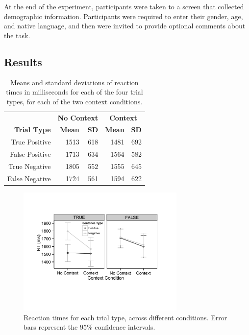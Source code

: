 \documentclass[10pt,letterpaper]{article}
\begin{document}
At the end of the experiment, participants were taken to a screen that collected demographic information.  Participants were required to enter their gender, age, and native language, and then were invited to provide optional comments about the task.  

\subsection{Results}

\begin{table}[t]
\caption{Means and standard deviations of reaction times in milliseconds for each of the four trial types, for each of the two context conditions.}
\begin{center}
\small\addtolength{\tabcolsep}{-5pt}
\begin{tabular}{ r  r  r  r  r } 
\hline
& \multicolumn{2}{c}{\bf{No Context}} & \multicolumn{2}{c}{\bf{Context}} \\
  \bf{Trial Type} & \bf{Mean} & \bf{SD} & \bf{Mean} & \bf{SD} \\ \hline                    
True Positive & 1513 & 618 &  1481 & 692\\
 False Positive & 1713 & 634 &  1564 & 582\\
 True Negative& 1805 & 552 & 1555 & 645\\
  False Negative & 1724 & 561 & 1594 & 622 \\
\hline
\end{tabular}
\end{center}
\end{table}

\begin{figure}
\begin{center} 
\includegraphics[width=3.25in]{figures/study1_linegraph.pdf}
\caption{\label{fig:addition_subs} Reaction times for each trial type, across different conditions.  Error bars represent the 95\% confidence intervals.}
\end{center} 
\end{figure}
\end{document}
